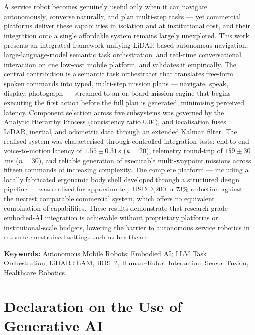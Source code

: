 \documentclass[11pt,a4paper]{article}
\begin{document}
A service robot becomes genuinely useful only when it can navigate autonomously, converse naturally, and plan multi-step tasks --- yet commercial platforms deliver these capabilities in isolation and at institutional cost, and their integration onto a single affordable system remains largely unexplored. This work presents an integrated framework unifying LiDAR-based autonomous navigation, large-language-model semantic task orchestration, and real-time conversational interaction on one low-cost mobile platform, and validates it empirically. The central contribution is a semantic task orchestrator that translates free-form spoken commands into typed, multi-step mission plans --- navigate, speak, display, photograph --- streamed to an on-board mission engine that begins executing the first action before the full plan is generated, minimising perceived latency. Component selection across five subsystems was governed by the Analytic Hierarchy Process (consistency ratio 0.04), and localisation fuses LiDAR, inertial, and odometric data through an extended Kalman filter. The realised system was characterised through controlled integration tests: end-to-end voice-to-motion latency of $1.55 \pm 0.31$\,s ($n=20$), telemetry round-trip of $159 \pm 30$\,ms ($n=30$), and reliable generation of executable multi-waypoint missions across fifteen commands of increasing complexity. The complete platform --- including a locally fabricated ergonomic body shell developed through a structured design pipeline --- was realised for approximately USD~3{,}200, a 73\% reduction against the nearest comparable commercial system, which offers no equivalent combination of capabilities. These results demonstrate that research-grade embodied-AI integration is achievable without proprietary platforms or institutional-scale budgets, lowering the barrier to autonomous service robotics in resource-constrained settings such as healthcare.

\vspace{0.4cm}
\noindent\textbf{Keywords:} Autonomous Mobile Robots; Embodied AI; LLM Task Orchestration; LiDAR SLAM; ROS~2; Human--Robot Interaction; Sensor Fusion; Healthcare Robotics.

\newpage
\thispagestyle{empty}
\section*{Declaration on the Use of Generative AI}
\end{document}
